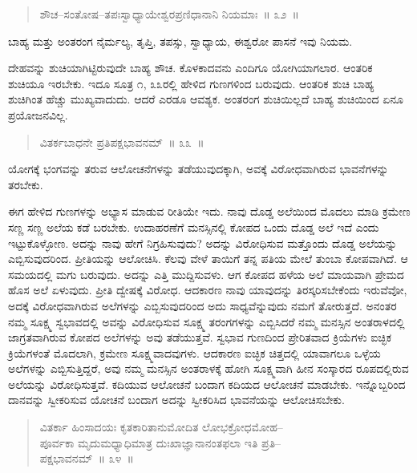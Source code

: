 \vspace{-0.3cm}

\begin{verse}
ಶೌಚ–ಸಂತೋಷ–ತಪಃಸ್ವಾಧ್ಯಾಯೇಶ್ವರಪ್ರಣಿಧಾನಾನಿ ನಿಯಮಾಃ~॥ ೩೨~॥
\end{verse}

\vspace{-0.3cm}

ಬಾಹ್ಯ ಮತ್ತು ಅಂತರಂಗ ನೈರ್ಮಲ್ಯ, ತೃಪ್ತಿ, ತಪಸ್ಸು, ಸ್ವಾಧ್ಯಾಯ, ಈಶ್ವರೋ ಪಾಸನೆ ಇವು ನಿಯಮ. 

ದೇಹವನ್ನು ಶುಚಿಯಾಗಿಟ್ಟಿರುವುದೇ ಬಾಹ್ಯ ಶೌಚ. ಕೊಳಕಾದವನು ಎಂದಿಗೂ ಯೋಗಿಯಾಗಲಾರ. ಆಂತರಿಕ ಶುಚಿಯೂ ಇರಬೇಕು. ಇದೂ ಸೂತ್ರ ೧, ೩೩ರಲ್ಲಿ ಹೇಳಿದ ಗುಣಗಳಿಂದ ಬರುವುದು. ಆಂತರಿಕ ಶುಚಿ ಬಾಹ್ಯ ಶುಚಿಗಿಂತ ಹೆಚ್ಚು ಮುಖ್ಯವಾದುದು. ಆದರೆ ಎರಡೂ ಆವಶ್ಯಕ. ಅಂತರಂಗ ಶುಚಿಯಿಲ್ಲದೆ ಬಾಹ್ಯ ಶುಚಿಯಿಂದ ಏನೂ ಪ್ರಯೋಜನವಿಲ್ಲ. 

\vspace{-0.3cm}

\begin{verse}
ವಿತರ್ಕಬಾಧನೇ ಪ್ರತಿಪಕ್ಷಭಾವನಮ್​~॥ ೩೩~॥
\end{verse}

\vspace{-0.3cm}

ಯೋಗಕ್ಕೆ ಭಂಗವನ್ನು ತರುವ ಆಲೋಚನೆಗಳನ್ನು ತಡೆಯುವುದಕ್ಕಾಗಿ, ಅವಕ್ಕೆ ವಿರೋಧವಾಗಿರುವ ಭಾವನೆಗಳನ್ನು ತರಬೇಕು. 

ಈಗ ಹೇಳಿದ ಗುಣಗಳನ್ನು ಅಭ್ಯಾಸ ಮಾಡುವ ರೀತಿಯೇ ಇದು. ನಾವು ದೊಡ್ಡ ಅಲೆಯಿಂದ ಮೊದಲು ಮಾಡಿ ಕ್ರಮೇಣ ಸಣ್ಣ ಸಣ್ಣ ಅಲೆಯ ಕಡೆ ಬರಬೇಕು. ಉದಾಹರಣೆಗೆ ಮನಸ್ಸಿನಲ್ಲಿ ಕೋಪದ ಒಂದು ದೊಡ್ಡ ಅಲೆ ಇದೆ ಎಂದು ಇಟ್ಟುಕೊಳ್ಳೋಣ. ಅದನ್ನು ನಾವು ಹೇಗೆ ನಿಗ್ರಹಿಸುವುದು? ಅದನ್ನು ವಿರೋಧಿಸುವ ಮತ್ತೊಂದು ದೊಡ್ಡ ಅಲೆಯನ್ನು ಎಬ್ಬಿಸುವುದರಿಂದ. ಪ್ರೀತಿಯನ್ನು ಆಲೋಚಿಸಿ. ಕೆಲವು ವೇಳೆ ತಾಯಿಗೆ ತನ್ನ ಪತಿಯ ಮೇಲೆ ತುಂಬಾ ಕೋಪವಾಗಿದೆ. ಆ ಸಮಯದಲ್ಲಿ ಮಗು ಬರುವುದು. ಅದನ್ನು ಎತ್ತಿ ಮುದ್ದಿಸುವಳು. ಆಗ ಕೋಪದ ಹಳೆಯ ಅಲೆ ಮಾಯವಾಗಿ ಪ್ರೇಮದ ಹೊಸ ಅಲೆ ಏಳುವುದು. ಪ್ರೀತಿ ದ್ವೇಷಕ್ಕೆ ವಿರೋಧ. ಆದಕಾರಣ ನಾವು ಯಾವುದನ್ನು ತಿರಸ್ಕರಿಸಬೇಕೆಂದು ಇರುವೆವೋ, ಅದಕ್ಕೆ ವಿರೋಧವಾಗಿರುವ ಅಲೆಗಳನ್ನು ಎಬ್ಬಿಸುವುದರಿಂದ ಅದು ಸಾಧ್ಯವೆನ್ನುವುದು ನಮಗೆ ತೋರುತ್ತದೆ. ಅನಂತರ ನಮ್ಮ ಸೂಕ್ಷ್ಮ ಸ್ವಭಾವದಲ್ಲಿ ಅವನ್ನು ವಿರೋಧಿಸುವ ಸೂಕ್ಷ್ಮ ತರಂಗಗಳನ್ನು ಎಬ್ಬಿಸಿದರೆ ನಮ್ಮ ಮನಸ್ಸಿನ ಅಂತರಾಳದಲ್ಲಿ ಜಾಗ್ರತವಾಗಿರುವ ಕೋಪದ ಅಲೆಗಳನ್ನು ಅವು ತಡೆಯುತ್ತವೆ. ಸ್ವಭಾವ ಗುಣದಿಂದ ಪ್ರೇರಿತವಾದ ಕ್ರಿಯೆಗಳು ಐಚ್ಛಿಕ ಕ್ರಿಯೆಗಳಂತೆ ಮೊದಲಾಗಿ, ಕ್ರಮೇಣ ಸೂಕ್ಷ್ಮವಾದವುಗಳು. ಆದಕಾರಣ ಐಚ್ಛಿಕ ಚಿತ್ತದಲ್ಲಿ ಯಾವಾಗಲೂ ಒಳ್ಳೆಯ ಅಲೆಗಳನ್ನು ಎಬ್ಬಿಸುತ್ತಿದ್ದರೆ, ಅವು ನಮ್ಮ ಮನಸ್ಸಿನ ಅಂತರಾಳಕ್ಕೆ ಹೋಗಿ ಸೂಕ್ಷ್ಮವಾಗಿ ಹೀನ ಸಂಸ್ಕಾರದ ರೂಪದಲ್ಲಿರುವ ಅಲೆಯನ್ನು ವಿರೋಧಿಸುತ್ತವೆ. ಕದಿಯುವ ಆಲೋಚನೆ ಬಂದಾಗ ಕದಿಯದ ಆಲೋಚನೆ ಮಾಡಬೇಕು. ಇನ್ನೊಬ್ಬರಿಂದ ದಾನವನ್ನು ಸ್ವೀಕರಿಸುವ ಯೋಚನೆ ಬಂದಾಗ ಅದನ್ನು ಸ್ವೀಕರಿಸಿದ ಭಾವನೆಯನ್ನು ಆಲೋಚಿಸಬೇಕು. 

\vspace{-0.35cm}

\begin{verse}
ವಿತರ್ಕಾ ಹಿಂಸಾದಯಃ ಕೃತಕಾರಿತಾನುಮೋದಿತ ಲೋಭಕ್ರೋಧಮೋಹ–\\ಪೂರ್ವಕಾ ಮೃದುಮಧ್ಯಾಧಿಮಾತ್ರ ದುಃಖಾಜ್ಞಾನಾನಂತಫಲಾ ಇತಿ ಪ್ರತಿ–\\ಪಕ್ಷಭಾವನಮ್​~॥ ೩೪~॥
\end{verse}

